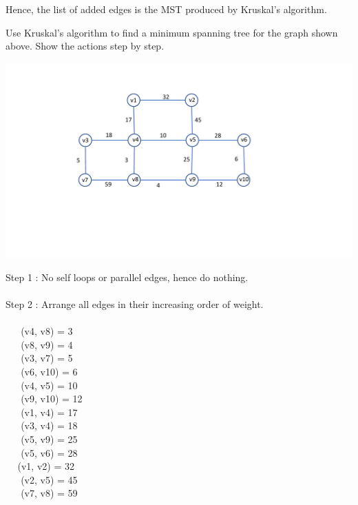 \documentclass[addpoints,11pt]{exam}
\begin{document}
\begin{questions}
\begin{solutionorbox}
Hence,  the list of added edges is the MST produced by Kruskal's algorithm.
\end{solutionorbox}

\ifprintanswers
\newpage
\else
\bigskip
\fi


%
%
\question[10]
Use Kruskal's algorithm to find a minimum spanning tree for the graph shown above.  Show the actions step by step.

\includegraphics[scale=0.5]{g1.pdf}
\begin{solutionorbox}
Step 1 : No self loops or parallel edges, hence do nothing. \\
\\
Step 2 : Arrange all edges in their increasing order of weight. \\
\\
 $\hspace{15pt}$ (v4, v8) = 3\\
 $\hspace{15pt}$ (v8, v9) = 4\\
 $\hspace{15pt}$ (v3, v7) = 5\\
 $\hspace{15pt}$ (v6, v10) = 6\\ 
 $\hspace{15pt}$ (v4, v5) = 10\\
 $\hspace{15pt}$ (v9, v10) = 12\\
 $\hspace{15pt}$ (v1, v4) = 17\\
$\hspace{15pt}$ (v3, v4) = 18\\
$\hspace{15pt}$ (v5, v9) = 25\\
$\hspace{15pt}$ (v5, v6) = 28\\
$\hspace{15pt}$(v1, v2) = 32\\
$\hspace{15pt}$ (v2, v5) = 45\\
$\hspace{15pt}$ (v7, v8) = 59\\




\end{solutionorbox}
\end{questions}
\end{document}
